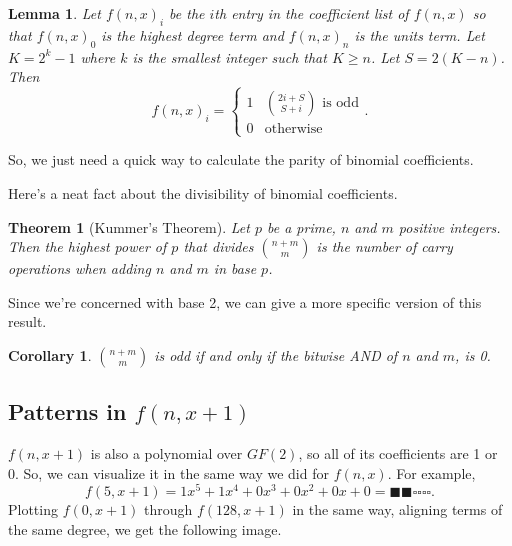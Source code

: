 \documentclass{article}
\newtheorem{lemma}{Lemma}
\newtheorem{theorem}{Theorem}
\newtheorem{corollary}{Corollary}
\begin{document}
	\begin{lemma}
		Let $f(n,x)_i$ be the $i$th entry in the coefficient list of $f(n,x)$ so that $f(n,x)_0$ is the highest degree term and $f(n,x)_n$ is the units term.
		Let $K = 2^k - 1$ where $k$ is the smallest integer such that $K \geq n$.
		Let $S = 2(K-n)$.
		Then
		\begin{equation*}
			f(n,x)_i = \begin{cases}
				1 & \binom{2i + S}{S + i} \text{ is odd} \\
				0 & \text{otherwise}
			\end{cases}.
		\end{equation*}	
	\end{lemma}

	So, we just need a quick way to calculate the parity of binomial coefficients.
	

	Here's a neat fact about the divisibility of binomial coefficients.
	
	\begin{theorem}[Kummer's Theorem]
		Let $p$ be a prime, $n$ and $m$ positive integers.
		Then the highest power of $p$ that divides $\binom{n+m}{m}$ is the number of carry operations when adding $n$ and $m$ in base $p$.
	\end{theorem}
	
	Since we're concerned with base 2, we can give a more specific version of this result.
	
	\begin{corollary}
		$\binom{n+m}{m}$ is odd if and only if the bitwise AND of $n$ and $m$, is 0.
	\end{corollary}
	
	\subsection{Patterns in $f(n,x+1)$}
	$f(n,x+1)$ is also a polynomial over $GF(2)$, so all of its coefficients are 1 or 0.
	So, we can visualize it in the same way we did for $f(n,x)$.
	For example,
	\begin{equation*}
		f(5,x+1) = 1x^5 + 1x^4 + 0x^3 + 0x^2 + 0x + 0 = \blacksquare\blacksquare\square\square\square\square.
	\end{equation*}
	Plotting $f(0,x+1)$ through $f(128,x+1)$ in the same way, aligning terms of the same degree, we get the following image.
	
\end{document}

